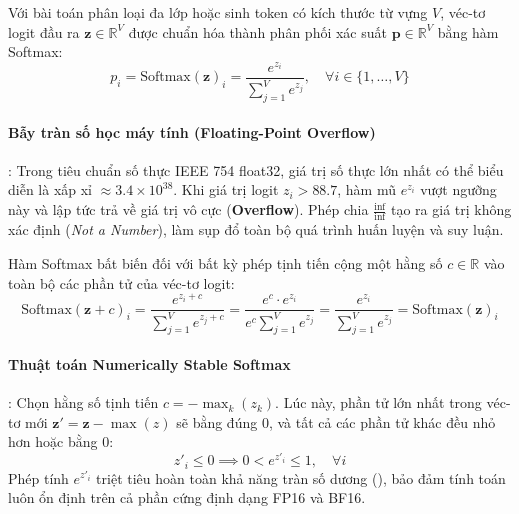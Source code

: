 Với bài toán phân loại đa lớp hoặc sinh token có kích thước từ vựng $V$, véc-tơ logit đầu ra $\mathbf{z} \in \mathbb{R}^V$ được chuẩn hóa thành phân phối xác suất $\mathbf{p} \in \mathbb{R}^V$ bằng hàm Softmax:
\begin{equation}
p_i = \text{Softmax}(\mathbf{z})_i = \frac{e^{z_i}}{\sum_{j=1}^V e^{z_j}}, \quad \forall i \in \{1, \dots, V\}
\label{eq:softmax-def}
\end{equation}

\paragraph{Bẫy tràn số học máy tính (Floating-Point Overflow)}:
Trong tiêu chuẩn số thực IEEE 754 float32, giá trị số thực lớn nhất có thể biểu diễn là xấp xỉ $\approx 3.4 \times 10^{38}$. Khi giá trị logit $z_i > 88.7$, hàm mũ $e^{z_i}$ vượt ngưỡng này và lập tức trả về giá trị vô cực  (\textbf{Overflow}). Phép chia $\frac{\text{inf}}{\text{inf}}$ tạo ra giá trị không xác định  (\textit{Not a Number}), làm sụp đổ toàn bộ quá trình huấn luyện và suy luận.

\begin{theorem}
Hàm Softmax bất biến đối với bất kỳ phép tịnh tiến cộng một hằng số $c \in \mathbb{R}$ vào toàn bộ các phần tử của véc-tơ logit:
\begin{equation}
\text{Softmax}(\mathbf{z} + c)_i = \frac{e^{z_i + c}}{\sum_{j=1}^V e^{z_j + c}} = \frac{e^c \cdot e^{z_i}}{e^c \sum_{j=1}^V e^{z_j}} = \frac{e^{z_i}}{\sum_{j=1}^V e^{z_j}} = \text{Softmax}(\mathbf{z})_i
\label{eq:softmax-shift-invariance}
\end{equation}
\end{theorem}

\paragraph{Thuật toán Numerically Stable Softmax}:
Chọn hằng số tịnh tiến $c = -\max_{k}(z_k)$. Lúc này, phần tử lớn nhất trong véc-tơ mới $\mathbf{z}' = \mathbf{z} - \max(z)$ sẽ bằng đúng $0$, và tất cả các phần tử khác đều nhỏ hơn hoặc bằng $0$:
\begin{equation*}
z'_i \le 0 \implies 0 < e^{z'_i} \le 1, \quad \forall i
\end{equation*}
Phép tính $e^{z'_i}$ triệt tiêu hoàn toàn khả năng tràn số dương (), bảo đảm tính toán luôn ổn định trên cả phần cứng định dạng FP16 và BF16.

